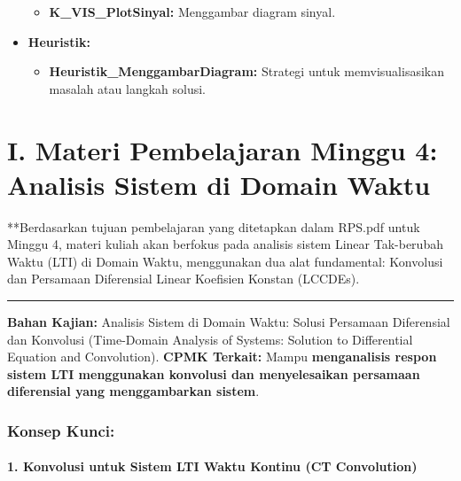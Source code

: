 \documentclass[
  letterpaper,
  DIV=11,
  numbers=noendperiod]{scrreprt}
\providecommand{\tightlist}{%
  \setlength{\itemsep}{0pt}\setlength{\parskip}{0pt}}
\begin{document}
\begin{itemize}
  \begin{itemize}
  \tightlist
  \item
    \textbf{K\_VIS\_PlotSinyal:} Menggambar diagram sinyal.
  \end{itemize}
\item
  \textbf{Heuristik:}

  \begin{itemize}
  \tightlist
  \item
    \textbf{Heuristik\_MenggambarDiagram:} Strategi untuk
    memvisualisasikan masalah atau langkah solusi.
  \end{itemize}
\end{itemize}


\chapter{I. Materi Pembelajaran Minggu 4: Analisis Sistem di Domain
Waktu}\label{i.-materi-pembelajaran-minggu-4-analisis-sistem-di-domain-waktu}

**Berdasarkan tujuan pembelajaran yang ditetapkan dalam RPS.pdf untuk
Minggu 4, materi kuliah akan berfokus pada analisis sistem Linear
Tak-berubah Waktu (LTI) di Domain Waktu, menggunakan dua alat
fundamental: Konvolusi dan Persamaan Diferensial Linear Koefisien
Konstan (LCCDEs).

\begin{center}\rule{0.5\linewidth}{0.5pt}\end{center}

\textbf{Bahan Kajian:} Analisis Sistem di Domain Waktu: Solusi Persamaan
Diferensial dan Konvolusi (Time-Domain Analysis of Systems: Solution to
Differential Equation and Convolution). \textbf{CPMK Terkait:} Mampu
\textbf{menganalisis respon sistem LTI menggunakan konvolusi dan
menyelesaikan persamaan diferensial yang menggambarkan sistem}.

\subsection{Konsep Kunci:}\label{konsep-kunci}

\subsubsection{1. Konvolusi untuk Sistem LTI Waktu Kontinu (CT
Convolution)}\label{konvolusi-untuk-sistem-lti-waktu-kontinu-ct-convolution}
\end{document}
